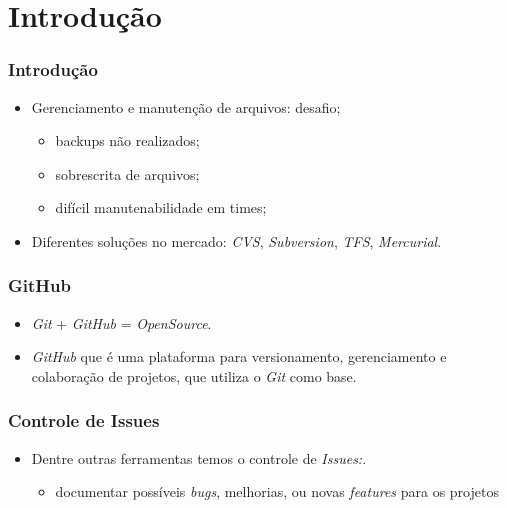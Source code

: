 \section[Introdução]{Introdução}

\begin{frame}
  \frametitle{Introdução}
  \begin{itemize}
    \item Gerenciamento e manutenção de arquivos: desafio;
          \begin{itemize}
            \item backups não realizados;
            \item sobrescrita de arquivos;
            \item difícil manutenabilidade em times;
          \end{itemize}
    \item Diferentes soluções no mercado: \textit{CVS}, \textit{Subversion}, \textit{TFS}, \textit{Mercurial}.
  \end{itemize}
\end{frame}

\begin{frame}
  \frametitle{GitHub}
  \begin{itemize}
    \item \textit{Git} + \textit{GitHub} = \textit{OpenSource}.
    \item \textit{GitHub} que é uma plataforma para versionamento, gerenciamento e colaboração de projetos, que utiliza o \textit{Git} como base.
  \end{itemize}
\end{frame}

\begin{frame}
  \frametitle{Controle de Issues}
  \begin{itemize}
    \item Dentre outras ferramentas temos o controle de \textit{Issues:}.
          \begin{itemize}
            \item documentar possíveis \textit{bugs}, melhorias, ou novas \textit{features} para os projetos
          \end{itemize}
  \end{itemize}
\end{frame}

